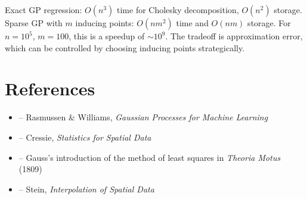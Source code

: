 \begin{solution}
Exact GP regression: $O(n^3)$ time for Cholesky decomposition, $O(n^2)$ storage. Sparse GP with $m$ inducing points: $O(nm^2)$ time and $O(nm)$ storage. For $n = 10^5$, $m = 100$, this is a speedup of $\sim 10^9$. The tradeoff is approximation error, which can be controlled by choosing inducing points strategically.
\end{solution}


\section{References}

\begin{itemize}
    \item \cite{rasmussen-williams} -- Rasmussen \& Williams, \textit{Gaussian Processes for Machine Learning}
    \item \cite{cressie} -- Cressie, \textit{Statistics for Spatial Data}
    \item \cite{gauss-theoria} -- Gauss's introduction of the method of least squares in \textit{Theoria Motus} (1809)
    \item \cite{stein} -- Stein, \textit{Interpolation of Spatial Data}
\end{itemize}